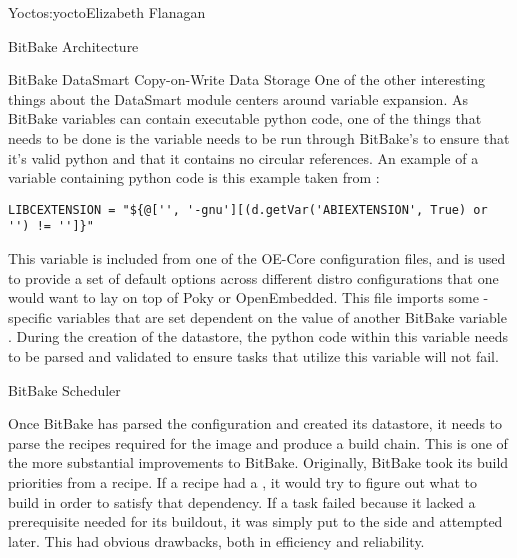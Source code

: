 \begin{aosachapter}{Yocto}{s:yocto}{Elizabeth Flanagan}
\begin{aosasect1}{BitBake Architecture}
\begin{aosasect2}{BitBake DataSmart Copy-on-Write Data Storage}
One of the other interesting things about the DataSmart module centers
around variable expansion. As BitBake variables can contain executable
python code, one of the things that needs to be done is the variable needs
to be run through BitBake's  to ensure that it's valid
python and that it contains no circular references.  An example of a
variable containing python code is this example taken from
:

\begin{verbatim}
LIBCEXTENSION = "${@['', '-gnu'][(d.getVar('ABIEXTENSION', True) or '') != '']}"
\end{verbatim}

This variable is included from one of the OE-Core configuration files,
\linebreak {} and is used to
provide a set of default options across different distro
configurations that one would want to lay on top of Poky or
OpenEmbedded. This file imports some -specific variables that
are set dependent on the value of another BitBake variable
. During the creation of the datastore, the python code within
this variable needs to be parsed and validated to ensure tasks that
utilize this variable will not fail.

\end{aosasect2}

\begin{aosasect2}{BitBake Scheduler}

Once BitBake has parsed the configuration and created its datastore,
it needs to parse the recipes required for the image and produce a
build chain. This is one of the more substantial improvements to
BitBake. Originally, BitBake took its build priorities from a
recipe. If a recipe had a , it would try to figure out what to
build in order to satisfy that dependency. If a task failed because it
lacked a prerequisite needed for its buildout, it was simply put to
the side and attempted later. This had obvious drawbacks, both in
efficiency and reliability.



\end{aosasect2}
\end{aosasect1}
\end{aosachapter}
